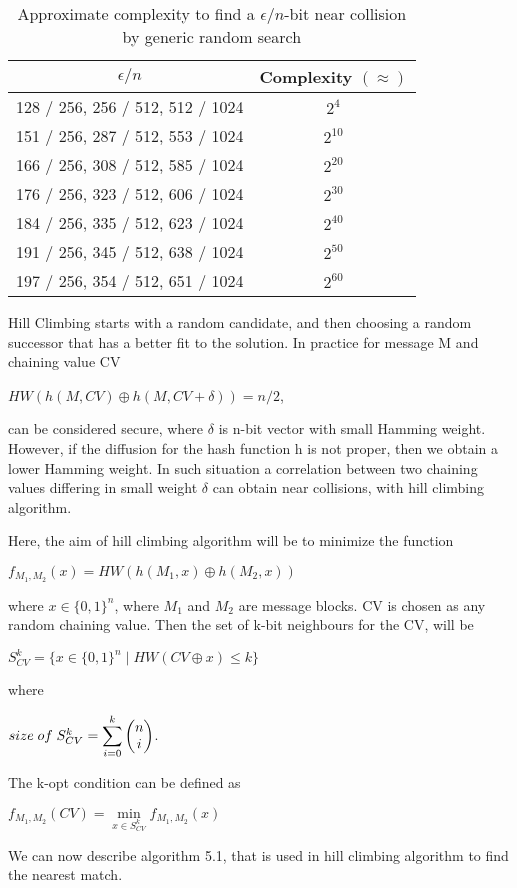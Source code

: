 \begin{table}[h]
  \begin{center}
    \begin{tabular}{ | c | c | } \hline
      $\epsilon / n $                         & Complexity $( \approx )$ \\ \hline
      128 / 256, 256 / 512, 512 / 1024 & $2^{4}$ \\ \hline
      151 / 256, 287 / 512, 553 / 1024 & $2^{10}$ \\ \hline
      166 / 256, 308 / 512, 585 / 1024 & $2^{20}$ \\ \hline
      176 / 256, 323 / 512, 606 / 1024 & $2^{30}$ \\ \hline
      184 / 256, 335 / 512, 623 / 1024 & $2^{40}$ \\ \hline
      191 / 256, 345 / 512, 638 / 1024 & $2^{50}$ \\ \hline
      197 / 256, 354 / 512, 651 / 1024 & $2^{60}$ \\ \hline
    \end{tabular}
    \caption{Approximate complexity to find a $\epsilon / n$-bit near collision by generic random search\cite{00029}}
  \end{center}
\end{table}

Hill Climbing starts with a random candidate, and then choosing a random successor that has a better fit to the
solution. In practice for message M and chaining value CV 
\begin{center}$HW( h(M, CV) \oplus h(M, CV + \delta) ) = n / 2 $,\end{center}
can be considered secure, where $\delta$ is n-bit vector with small Hamming weight. However, if the diffusion for the 
hash function h is not proper, then we obtain a lower Hamming weight. In such situation a correlation between two 
chaining values differing in small weight $\delta$ can obtain near collisions, with hill climbing algorithm.

Here, the aim of hill climbing algorithm will be to minimize the function 
\begin{center}$f_{M_{1}, M_{2}}(x) = HW( h(M_{1}, x) \oplus h(M_{2}, x) )$\end{center}
where $x \in \{0, 1\}^{n}$, where $M_{1}$ and $M_{2}$ are message blocks. CV is chosen as any random chaining value. Then the 
set of k-bit neighbours for the CV, will be 
\begin{center}$S^{k}_{CV} = \{ x \in \{0, 1\}^{n} \mid HW( CV \oplus x ) \leq k \}$\end{center}
where 
\begin{center}$ size \thickspace of \thickspace S^{k}_{CV} = \displaystyle \sum \limits_{i = 0}^{k} \begin{pmatrix} n \\ i \end{pmatrix}$.\end{center}
The k-opt condition can be defined as 
\begin{center}$f_{M_{1}, M_{2}} (CV) =  \min\limits_{x \in S^{k}_{CV}} f_{M_{1}, M_{2}} (x)$\end{center}
We can now describe algorithm 5.1, that is used in hill climbing algorithm to find the nearest match. 

